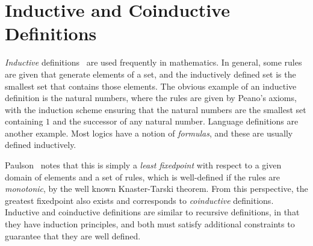 \section{Inductive and Coinductive Definitions}
\label{inductive-definitions}

\emph{Inductive} definitions~\cite{Aczel:Handbook} are used frequently in
mathematics.  In general, some rules are given that generate elements of a
set, and the inductively defined set is the smallest set that contains
those elements.  The obvious example of an inductive definition is the
natural numbers, where the rules are given by Peano's axioms, with the
induction scheme ensuring that the natural numbers are the smallest set
containing $1$ and the successor of any natural number.  Language
definitions are another example.  Most logics have a notion of
\emph{formulas}, and these are usually defined inductively.

Paulson~\cite{paulson-fixedpoint} notes that this is simply a \emph{least
fixedpoint} with respect to a given domain of elements and a set of rules,
which is well-defined if the rules are \emph{monotonic}, by the
well known Knaster-Tarski theorem.  From this perspective, the greatest
fixedpoint also exists and corresponds to \emph{coinductive} definitions.
Inductive and coinductive definitions are similar to recursive
definitions, in that they have induction principles, and both must satisfy
additional constraints to guarantee that they are well defined.

